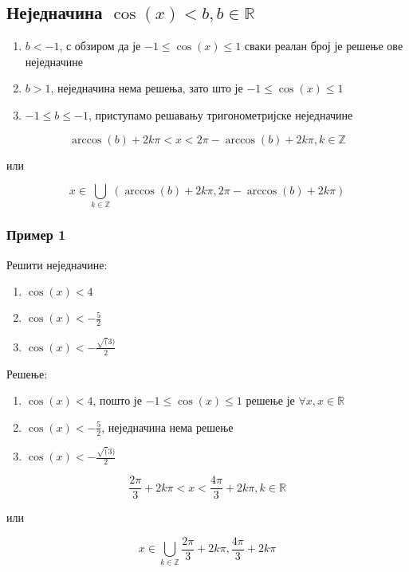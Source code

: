 \documentclass[../diplomski.tex]{subfiles}
\begin{document}
\subsection{Неједначина $\cos(x)<b,b\in\mathbb{R}$}

\begin{enumerate}[label=\alph*)]
\item $b<-1$, с обзиром да је $-1\leq\cos(x)\leq1$ сваки реалан број је решење ове неједначине
\item $b>1$, неједначина нема решења, зато што је $-1\leq\cos(x)\leq1$
\item $-1\leq b\leq-1$, приступамо решавању тригонометријске неједначине
\end{enumerate}

\[\arccos(b)+2k\pi<x<2\pi-\arccos(b)+2k\pi,k\in\mathbb{Z}\]
\centerline{или}
\[x\in\bigcup_{k\in\mathbb{Z}}\left(\arccos(b)+2k\pi,2\pi-\arccos(b)+2k\pi\right)\]


\subsubsection{Пример 1}

Решити неједначине:

\begin{enumerate}[label=\alph*)]
\item $\cos(x)<4$
\item $\cos(x)<-\frac{5}{2}$
\item $\cos(x)<-\frac{\sqrt(3)}{2}$
\end{enumerate}

Решење:

\begin{enumerate}[label=\alph*)]
\item $\cos(x)<4$, пошто је $-1\leqslant\cos(x)\leqslant1$ решење је $\forall x,x\in\mathbb{R}$
\item $\cos(x)<-\frac{5}{2}$, неједначина нема решење
\item $\cos(x)<-\frac{\sqrt(3)}{2}$
\end{enumerate}

\[\frac{2\pi}{3}+2k\pi<x<\frac{4\pi}{3}+2k\pi,k\in\mathbb{R}\]
\centerline{или}
\[x\in\bigcup_{k\in\mathbb{Z}}\frac{2\pi}{3}+2k\pi,\frac{4\pi}{3}+2k\pi\]
\end{document}
